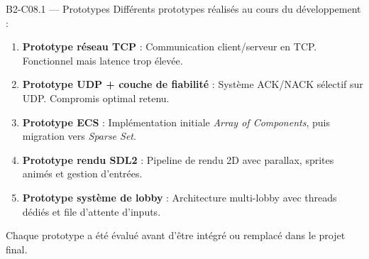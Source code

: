 \documentclass[aspectratio=169,10pt]{beamer}
\begin{document}
\begin{frame}{B2-C08.1 — Prototypes}
\footnotesize
Différents prototypes réalisés au cours du développement :

\begin{enumerate}\setlength\itemsep{2pt}
  \item \textbf{Prototype réseau TCP} : Communication client/serveur en TCP. Fonctionnel mais latence trop élevée.
  \item \textbf{Prototype UDP + couche de fiabilité} : Système ACK/NACK sélectif sur UDP. Compromis optimal retenu.
  \item \textbf{Prototype ECS} : Implémentation initiale \textit{Array of Components}, puis migration vers \textit{Sparse Set}.
  \item \textbf{Prototype rendu SDL2} : Pipeline de rendu 2D avec parallax, sprites animés et gestion d'entrées.
  \item \textbf{Prototype système de lobby} : Architecture multi-lobby avec threads dédiés et file d'attente d'inputs.
\end{enumerate}

\vspace{0.2em}
Chaque prototype a été évalué avant d'être intégré ou remplacé dans le projet final.

\end{frame}
\end{document}
